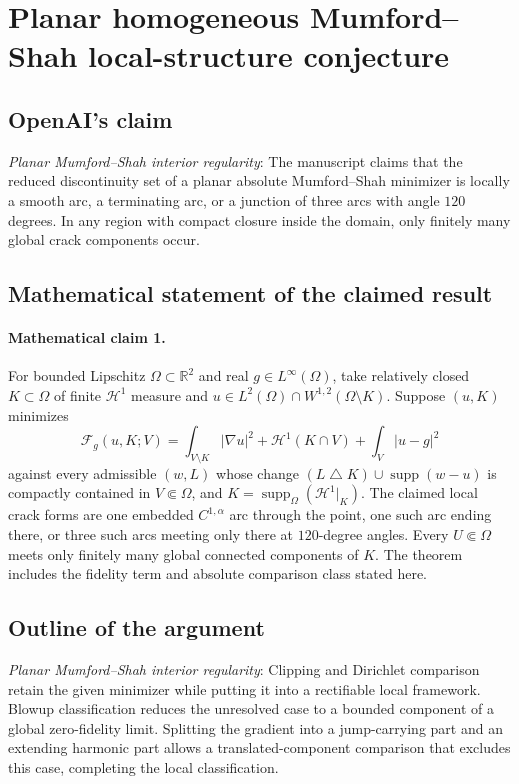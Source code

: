 \documentclass[11pt]{article}
\begin{document}
\section*{Planar homogeneous Mumford–Shah local-structure conjecture}

\subsection{OpenAI's claim}
\textit{Planar Mumford--Shah interior regularity}: The manuscript claims that the reduced discontinuity set of a planar absolute Mumford--Shah minimizer is locally a smooth arc, a terminating arc, or a junction of three arcs with angle $120$ degrees. In any region with compact closure inside the domain, only finitely many global crack components occur.

\subsection{Mathematical statement of the claimed result}
\paragraph{Mathematical claim 1.} For bounded Lipschitz $\Omega\subset\mathbb R^2$ and real $g\in L^\infty(\Omega)$, take relatively closed $K\subset\Omega$ of finite $\mathcal H^1$ measure and $u\in L^2(\Omega)\cap W^{1,2}(\Omega\setminus K)$. Suppose $(u,K)$ minimizes \[\mathcal F_g(u,K;V)=\int_{V\setminus K}|\nabla u|^2+\mathcal H^1(K\cap V)+\int_V|u-g|^2\] against every admissible $(w,L)$ whose change $(L\mathbin{\triangle} K)\cup\operatorname{supp}(w-u)$ is compactly contained in $V\Subset\Omega$, and $K=\operatorname{supp}_\Omega(\mathcal H^1|_K)$. The claimed local crack forms are one embedded $C^{1,\alpha}$ arc through the point, one such arc ending there, or three such arcs meeting only there at $120$-degree angles. Every $U\Subset\Omega$ meets only finitely many global connected components of $K$. The theorem includes the fidelity term and absolute comparison class stated here.

\subsection{Outline of the argument}
\textit{Planar Mumford--Shah interior regularity}: Clipping and Dirichlet comparison retain the given minimizer while putting it into a rectifiable local framework. Blowup classification reduces the unresolved case to a bounded component of a global zero-fidelity limit. Splitting the gradient into a jump-carrying part and an extending harmonic part allows a translated-component comparison that excludes this case, completing the local classification.
\end{document}
